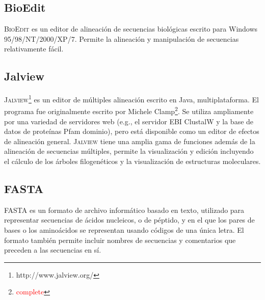 \documentclass[12pt,a4paper,spanish]{article}
\begin{document}

	\subsection{BioEdit}		%
		\par \textsc{BioEdit} es un editor de alineación de secuencias biológicas escrito para Windows 95/98/NT/2000/XP/7. Permite la alineación y manipulación de secuencias relativamente fácil.

	\subsection{Jalview}
		\par \textsc{Jalview}\footnote{http://www.jalview.org/} es un editor de múltiples alineación escrito en Java, multiplataforma. El programa fue 			originalmente escrito por Michele Clamp\footnote{\textcolor{red}{complete}}. Se utiliza ampliamente por una variedad de servidores web (e.g., el 			servidor EBI ClustalW y la base de datos de proteínas Pfam dominio), pero está disponible como un editor de efectos de alineación general. 			\textsc{Jalview} tiene una amplia gama de funciones además de la alineación de secuencias múltiples, permite la visualización y edición incluyendo 			el cálculo de los árboles filogenéticos y la visualización de estructuras moleculares. 






	\subsection{FASTA}
		\par \textsc{FASTA} \cite{1} es un formato de archivo informático basado en texto, utilizado para representar secuencias de ácidos nucleicos, o de 			péptido, y en el que los pares de bases o los aminoácidos se representan usando códigos de una única letra. El formato también permite incluir 			nombres de secuencias y comentarios que preceden a las secuencias en sí.	
\end{document}

